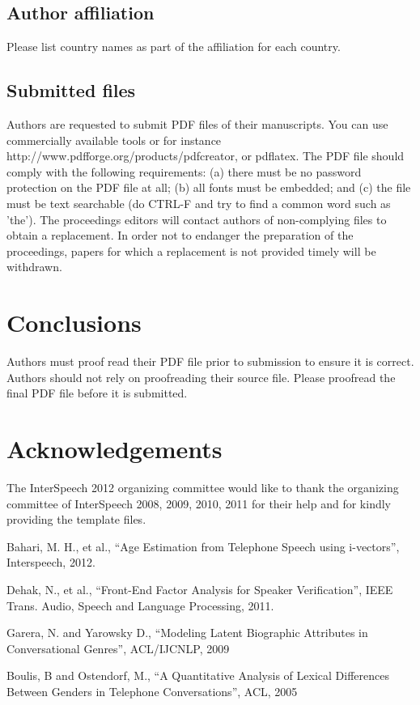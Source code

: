 \documentclass[a4paper]{article}
\begin{document}
\subsection{Author affiliation}
Please list country names as part of the affiliation for each country.


\subsection{Submitted files}
Authors are requested to submit PDF files of their manuscripts.
You can use commercially available tools or for instance http://www.pdfforge.org/products/pdfcreator, or pdflatex.
The PDF file should comply with the following requirements:
(a) there must be no password protection on the PDF file at all;
(b) all fonts must be embedded; and
(c) the file must be text searchable (do CTRL-F and try to find a common word such as 'the').
The proceedings editors will contact authors of non-complying files to obtain a replacement.
In order not to endanger the preparation of the proceedings, papers for which a replacement is not provided timely will be withdrawn.


\section{Conclusions}
Authors must proof read their PDF file prior to submission to ensure it is correct.
Authors should not rely on proofreading their source file.
Please proofread the final PDF file before it is submitted.

\section{Acknowledgements}
The InterSpeech 2012 organizing committee would like to thank the organizing committee of InterSpeech 2008, 2009, 2010, 2011 for their help and for kindly providing the template files.

\eightpt

\begin{thebibliography}{10}
 Bahari, M. H., et al., 
``Age Estimation from Telephone Speech using i-vectors'', 
Interspeech, 2012.

 Dehak, N., et al., 
``Front-End Factor Analysis for Speaker Verification'', 
IEEE Trans. Audio, Speech and Language Processing, 2011.

 Garera, N. and Yarowsky D.,
``Modeling Latent Biographic Attributes in Conversational Genres'',
ACL/IJCNLP, 2009

 Boulis, B and Ostendorf, M.,
``A Quantitative Analysis of Lexical Differences Between Genders in Telephone Conversations'',
ACL, 2005

\end{thebibliography}
\end{document}
